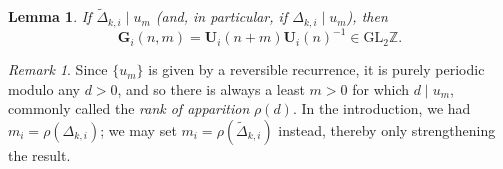 \documentclass{article}
\numberwithin{equation}{section}
\newtheorem{lem}[thm]{Lemma}
\theoremstyle{definition}
\theoremstyle{remark}
\newtheorem{rem}[thm]{Remark}
\newcommand{\GL}{\mathrm{GL}}
\newcommand{\ZZ}{\mathbb{Z}}
\newcommand{\<}{\left\langle}
\renewcommand{\>}{\right\rangle}
\begin{document}
\begin{lem}\label{lem:G_integral}
  If $\widetilde\Delta_{k,i} \mid u_m$ (and, in particular, if $\Delta_{k,i} \mid u_m$), then
  \begin{equation*}
    \mathbf{G}_i(n,m) = \mathbf{U}_i(n + m) \mathbf{U}_i(n)^{-1} \in \GL_2 \ZZ.
  \end{equation*}
\end{lem}
\begin{rem}
  Since $\{u_m\}$ is given by a reversible recurrence, it is purely periodic modulo any $d > 0$, and so there is always a least $m > 0$ for which $d \mid u_m$, commonly called the \emph{rank of apparition} $\rho(d)$. In the introduction, we had $m_i = \rho(\Delta_{k,i})$; we may set $m_i = \rho(\widetilde{\Delta}_{k,i})$ instead, thereby only strengthening the result.
\end{rem}
\end{document}
